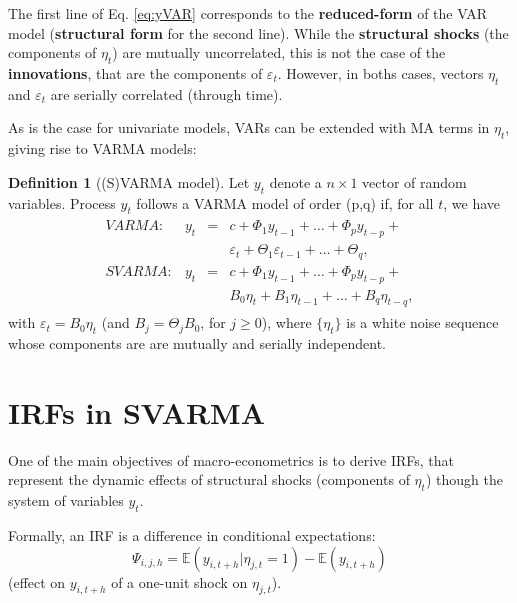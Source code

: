\documentclass[
  12pt,
]{book}
\theoremstyle{definition}
\newtheorem{definition}{Definition}[chapter]
\theoremstyle{definition}
\theoremstyle{definition}
\theoremstyle{definition}
\theoremstyle{remark}
\begin{document}
The first line of Eq. \eqref{eq:yVAR} corresponds to the \textbf{reduced-form} of the VAR model (\textbf{structural form} for the second line). While the \textbf{structural shocks} (the components of \(\eta_t\)) are mutually uncorrelated, this is not the case of the \textbf{innovations}, that are the components of \(\varepsilon_t\). However, in boths cases, vectors \(\eta_t\) and \(\varepsilon_t\) are serially correlated (through time).

As is the case for univariate models, VARs can be extended with MA terms in \(\eta_t\), giving rise to VARMA models:

\begin{definition}[(S)VARMA model]
\protect\hypertarget{def:SVARMA}{}\label{def:SVARMA}Let \(y_{t}\) denote a \(n \times1\) vector of random variables. Process \(y_{t}\) follows a VARMA model of order (p,q) if, for all \(t\), we have
\begin{eqnarray}
\begin{array}{rllll}
VARMA:& y_t &=& c + \Phi_1 y_{t-1} + \dots + \Phi_p y_{t-p} + \\
&&&\varepsilon_t + \Theta_1\varepsilon_{t-1} + \dots + \Theta_q ,\\
SVARMA:& y_t &=& c + \Phi_1 y_{t-1} + \dots + \Phi_p y_{t-p} + \\
&&& B_0 \eta_t+ B_1 \eta_{t-1} + \dots +  B_q \eta_{t-q},
\end{array}\label{eq:yVARMA}
\end{eqnarray}
with \(\varepsilon_t = B_0\eta_t\) (and \(B_j = \Theta_j B_0\), for \(j \ge 0\)), where \(\{\eta_{t}\}\) is a white noise sequence whose components are are mutually and serially independent.
\end{definition}

\hypertarget{IRFSVARMA}{%
\section{IRFs in SVARMA}\label{IRFSVARMA}}

One of the main objectives of macro-econometrics is to derive IRFs, that represent the dynamic effects of structural shocks (components of \(\eta_t\)) though the system of variables \(y_t\).

Formally, an IRF is a difference in conditional expectations:
\begin{equation}
\boxed{\Psi_{i,j,h} = \mathbb{E}(y_{i,t+h}|\eta_{j,t}=1) - \mathbb{E}(y_{i,t+h})}\label{eq:boxIRFs}
\end{equation}
(effect on \(y_{i,t+h}\) of a one-unit shock on \(\eta_{j,t}\)).
\end{document}
